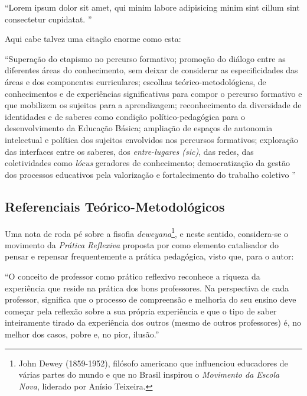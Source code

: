 \begin{citacao}
  ``Lorem ipsum dolor sit amet, qui minim labore adipisicing minim sint cillum sint consectetur cupidatat. ''
\end{citacao}

Aqui cabe talvez uma citação enorme como esta:

\begin{citacao}
  ``Superação do etapismo no percurso formativo; promoção do diálogo entre as diferentes áreas do conhecimento, sem deixar de considerar as especificidades das áreas e dos componentes curriculares; escolhas teórico-metodológicas, de conhecimentos e de experiências significativas para compor o percurso formativo e que mobilizem os sujeitos para a aprendizagem; reconhecimento da diversidade de identidades e de saberes como condição político-pedagógica para o desenvolvimento da Educação Básica; ampliação de espaços de autonomia intelectual e política dos sujeitos envolvidos nos percursos formativos; exploração das interfaces entre os saberes, dos \emph{entre-lugares (sic)}, das redes, das coletividades como \emph{lócus} geradores de conhecimento; democratização da gestão dos processos educativos pela valorização e fortalecimento do trabalho coletivo ''
\end{citacao}

\subsection{Referenciais Teórico-Metodológicos} %
\label{sub:Referenciais Teórico-Metodológicos}

Uma nota de roda pé sobre a fisofia \emph{deweyana}\footnote{John Dewey (1859-1952), filósofo americano que influenciou educadores de várias partes do mundo e que no Brasil inspirou o \emph{Movimento da Escola Nova}, liderado por Anísio Teixeira.}, e neste sentido, considera-se o movimento da \emph{Prática Reflexiva} proposta por \cite{ZEICHNER:1993} como elemento catalisador do pensar e repensar frequentemente a prática pedagógica, visto que, para o autor:

\begin{citacao}
  ``O conceito de professor como prático reflexivo reconhece a riqueza da experiência que reside na prática dos bons professores. Na perspectiva de cada professor, significa que o processo de compreensão e melhoria do seu ensino deve começar pela reflexão sobre a sua própria experiência e que o tipo de saber inteiramente tirado da experiência dos outros (mesmo de outros professores) é, no melhor dos casos, pobre e, no pior, ilusão.'' 
\end{citacao}

